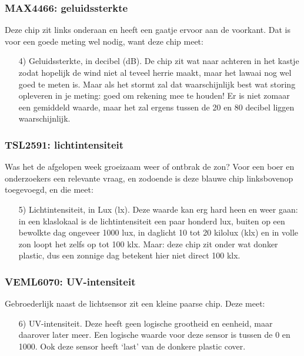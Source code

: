 \documentclass[a4paper,11pt, fleqn]{article}
\begin{document}
\subsubsection{MAX4466: geluidssterkte}
Deze chip zit links onderaan en heeft een gaatje ervoor aan de voorkant. Dat is voor een goede meting wel nodig, want deze chip meet:
\begin{itemize}
	\item[4)] Geluidssterkte, in decibel (dB). De chip zit wat naar achteren in het kastje zodat hopelijk de wind niet al teveel herrie maakt, maar het lawaai nog wel goed te meten is. Maar als het stormt zal dat waarschijnlijk best wat storing opleveren in je meting: goed om rekening mee te houden! Er is niet zomaar een gemiddeld waarde, maar het zal ergens tussen de 20 en 80 decibel liggen waarschijnlijk.
\end{itemize}

\subsubsection{TSL2591: lichtintensiteit}
Was het de afgelopen week groeizaam weer of ontbrak de zon? Voor een boer en onderzoekers een relevante vraag, en zodoende is deze blauwe chip linksbovenop toegevoegd, en die meet:
\begin{itemize}
	\item[5)] Lichtintensiteit, in Lux (lx). Deze waarde kan erg hard heen en weer gaan: in een klaslokaal is de lichtintensiteit een paar honderd lux, buiten op een bewolkte dag ongeveer 1000 lux, in daglicht 10 tot 20 kilolux (klx) en in volle zon loopt het zelfs op tot 100 klx. Maar: deze chip zit onder wat donker plastic, dus een zonnige dag betekent hier niet direct 100 klx.
\end{itemize}

\subsubsection{VEML6070: UV-intensiteit}
Gebroederlijk naast de lichtsensor zit een kleine paarse chip. Deze meet:
\begin{itemize}
	\item[6)] UV-intensiteit. Deze heeft geen logische grootheid en eenheid, maar daarover later meer. Een logische waarde voor deze sensor is tussen de 0 en 1000. Ook deze sensor heeft `last' van de donkere plastic cover.
\end{itemize}
\end{document}
